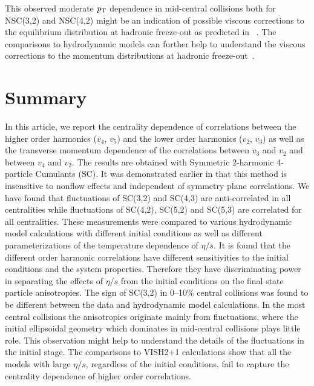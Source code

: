 This observed moderate $p_{\rm T}$ dependence in mid-central collisions both for NSC(3,2) and NSC(4,2) might be an indication of possible viscous corrections to the equilibrium distribution at hadronic freeze-out as predicted in ~\cite{Niemi:2012aj}.
The comparisons to hydrodynamic models can further help to understand the viscous corrections to the momentum distributions at hadronic freeze-out~\cite{Dusling:2009df,Luzum:2010ad,Teaney:2012ke,Molnar:2014fva,Niemi:2015qia}.


 
\section{Summary}
\label{sec:summary}
In this article, we report the centrality dependence of correlations between the higher order harmonics ($v_4$, $v_5$) and the lower order harmonics ($v_2$, $v_3$) as well as the transverse momentum dependence of the correlations between $v_3$ and $v_2$ and between $v_4$ and $v_2$.
The results are obtained with Symmetric 2-harmonic 4-particle Cumulants (SC). It was demonstrated earlier in \cite{ALICE:2016kpq} that this method is insensitive to nonflow effects and independent of symmetry plane correlations.
We have found that fluctuations of SC(3,2) and SC(4,3) are anti-correlated in all centralities while fluctuations of SC(4,2), SC(5,2) and SC(5,3) are correlated for all centralities. 
These measurements were compared to various hydrodynamic model calculations with different initial conditions as well as different parameterizations of the temperature dependence of $\eta/s$.
It is found that the different order harmonic correlations have different sensitivities to the initial conditions and the system properties. Therefore they have discriminating power in separating the effects of $\eta/s$  from the initial conditions on the final state particle anisotropies.
The sign of SC(3,2) in 0--10\% central collisions was found to be different between the data and hydrodynamic model calculations.
In the most central collisions the anisotropies originate mainly from fluctuations, where the initial ellipsoidal geometry which dominates in mid-central collisions plays little role. This observation might help to understand the details of the fluctuations in the initial stage. 
The comparisons to VISH2+1 calculations show that all the models with large $\eta/s$, regardless of the initial conditions, fail to capture the centrality dependence of higher order correlations. 
